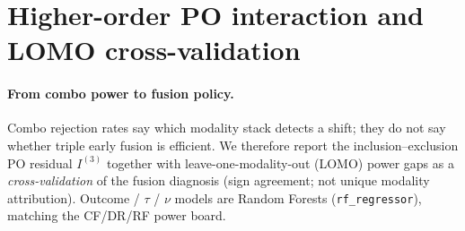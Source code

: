 \section{Higher-order PO interaction and LOMO cross-validation}
\paragraph{From combo power to fusion policy.}
Combo rejection rates say which modality stack detects a shift;
they do not say whether triple early fusion is efficient.
We therefore report the inclusion--exclusion PO residual $I^{(3)}$
together with leave-one-modality-out (LOMO) power gaps as a
\emph{cross-validation} of the fusion diagnosis
(sign agreement; not unique modality attribution).
Outcome / $\tau$ / $\nu$ models are Random Forests
(\texttt{rf\_regressor}), matching the CF/DR/RF power board.
% 

